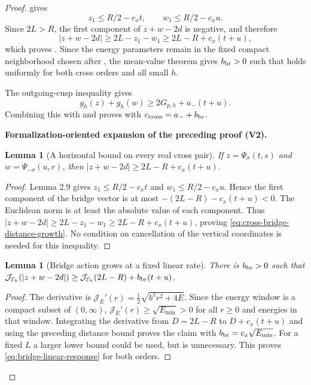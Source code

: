 \documentclass[11pt]{article}
\newtheorem{lemma}[theorem]{Lemma}
\newcommand{\formalisationparentid}{X}
\newenvironment{formalisationaddition}[1]{\par\medskip\begingroup\color{blue}\def\formalisationparentid{#1}\setcounter{formalizationsublemma}{0}\let\lemma\formalizationsublemma\let\endlemma\endformalizationsublemma
  \def\Eo{\mathcal E_h^\circ}\def\EE{\mathcal E_h}\def\phio{\phi_h^\circ}\def\phih{\phi_h}\def\Ho{H_h^{\rm atom}(v^\circ)}\def\Ha{H_h^{\rm atom}}\def\HL{H_h^{L}}\def\Dh{D_h}\def\Log{\operatorname{Log}}\def\ellh{\ell_h}\def\Gp{G_{p,h}}\def\Ast{A_{*,h}}\def\ahat{\widehat{\mathfrak a}_h}\def\ah{\mathfrak a_h}\def\rh{\widehat\rho_h}\def\deltah{\widehat\delta_h}\def\oldref##1{\textup{(##1)}}\def\interface##1{\par\noindent\textit{Analytical interface used here.} ##1\par}\def\finish{\par\noindent\textit{Conclusion of the formalization-oriented expansion.} }\par\noindent\textbf{Formalization-oriented expansion of the preceding proof (V2).}\par\smallskip
}{\par\endgroup\medskip
}
\newcommand{\cJ}{\mathcal J}
\begin{document}
\begin{proof}
 gives
\[
 z_1\le R/2-c_xt,
 \qquad
 w_1\le R/2-c_xu.
\]
Since $2L>R$, the first component of $z+w-2d$ is negative, and therefore
\[
 |z+w-2d|\ge 2L-z_1-w_1
 \ge 2L-R+c_x(t+u),
\]
which proves .  Since the energy
parameters remain in the fixed compact neighborhood chosen after
, the mean-value theorem gives $b_{\rm br}>0$ such that
 holds uniformly for both cross orders and
all small $h$.

The outgoing-cusp inequality gives
\[
 g_h(z)+g_h(w)\ge2G_{p,h}+a_-(t+u).
\]
Combining this with  and
 proves 
with $c_{\rm cross}=a_-+b_{\rm br}$.

\begin{formalisationaddition}{T5.4}
\begin{lemma}[A horizontal bound on every real cross pair]\label{sublemma:T5-4-distance}
If $z=\Psi_\sigma(t,s)$ and $w=\Psi_{-\sigma}(u,r)$, then
$|z+w-2d|\ge2L-R+c_x(t+u)$.
\end{lemma}
\begin{proof}
Lemma 2.9 gives $z_1\le R/2-c_xt$ and $w_1\le R/2-c_xu$. Hence the first component of the bridge vector is at most $-(2L-R)-c_x(t+u)<0$. The Euclidean norm is at least the absolute value of each component. Thus
$|z+w-2d|\ge2L-z_1-w_1\ge2L-R+c_x(t+u)$, proving \eqref{eq:cross-bridge-distance-growth}. No condition on cancellation of the vertical coordinates is needed for this inequality.
\end{proof}

\begin{lemma}[Bridge action grows at a fixed linear rate]\label{sublemma:T5-4-bridge-action}
There is $b_{\rm br}>0$ such that
$\cJ_{\mathcal E_h}(|z+w-2d|)\ge \cJ_{\mathcal E_h}(2L-R)+b_{\rm br}(t+u)$.
\end{lemma}
\begin{proof}
The derivative is $\cJ_E'(r)=\frac12\sqrt{b^2r^2+4E}$. Since the energy window is a compact subset of $(0,\infty)$, $\cJ_E'(r)\ge\sqrt{E_{\min}}>0$ for all $r\ge0$ and energies in that window. Integrating the derivative from $D=2L-R$ to $D+c_x(t+u)$ and using the preceding distance bound proves the claim with $b_{\rm br}=c_x\sqrt{E_{\min}}$. For a fixed $L$ a larger lower bound could be used, but is unnecessary. This proves \eqref{eq:bridge-linear-response} for both orders.
\end{proof}


\end{formalisationaddition}
\end{proof}
\end{document}
